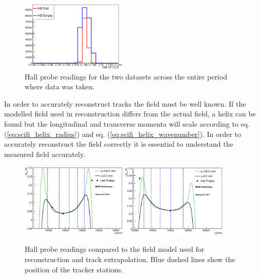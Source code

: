 \begin{figure}[!tbh]
    \includegraphics*[width=0.45\textwidth]{03-Detectors/Figures/HallProbes/hp_72.eps}
    \caption{Hall probe readings for the two datasets across the entire period where data was taken.}
\label{fig:hall_probes}
\end{figure}

In order to accurately reconstruct tracks the field must be well known. If the
modelled field used in reconstruction differs from the actual field, a helix
can be found but the longitudinal and transverse momenta will scale according to
eq. (\ref{eq:scifi_helix_radius}) and eq. (\ref{eq:scifi_helix_wavenumber}). In 
order to accurately reconstruct the field correctly it is essential to 
understand the measured field accurately.

\begin{figure}[!tbh]
    \centering
    \includegraphics*[width=0.45\textwidth]{03-Detectors/Figures/HallProbes/bfield_vs_z_ssu.eps}
    \includegraphics*[width=0.45\textwidth]{03-Detectors/Figures/HallProbes/bfield_vs_z_ssd.eps}
    \caption{Hall probe readings compared to the field model used for 
             reconstruction and track extrapolation. Blue dashed lines show the
             position of the tracker stations.}
\label{fig:field_map}
\end{figure}


